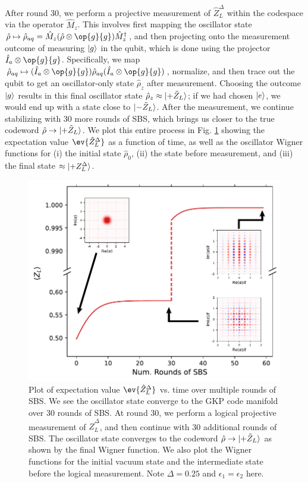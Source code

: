After round 30, we perform a projective measurement of $\hat{Z}_L^\Delta$ within the codespace via the operator $\hat{M}_z$. This involves first mapping the oscillator state $\hat{\rho} \mapsto \hat{\rho}_{aq} = \hat{M}_z(\hat{\rho}\otimes \op{g}{g})\hat{M}_z^\dagger$, and then projecting onto the measurement outcome of measuring $\lvert g\rangle$ in the qubit, which is done using the projector $\hat{I}_a \otimes \op{g}{g}$. Specifically, we map $\hat{\rho}_{aq} \mapsto (\hat{I}_a \otimes \op{g}{g}) \hat{\rho}_{aq}(\hat{I}_a \otimes \op{g}{g})$, normalize, and then trace out the qubit to get an oscillator-only state $\hat{\rho}_z$ after measurement. Choosing the outcome $\lvert g\rangle$ results in this final oscillator state $\hat{\rho}_z \approx \lvert+\tilde{Z}_L\rangle$; if we had chosen $\lvert e\rangle$, we would end up with a state close to $\lvert-\tilde{Z}_L\rangle$. After the measurement, we continue stabilizing with 30 more rounds of SBS, which brings us closer to the true codeword $\hat{\rho} \to \lvert+\tilde{Z}_L\rangle$. We plot this entire process in Fig. \ref{fig:2_SBS_NoLoss_QEC_Sim} showing the expectation value $\ev{\hat{Z}_L^\Delta}$ as a function of time, as well as the oscillator Wigner functions for (i) the initial state $\hat{\rho}_0$, (ii) the state before measurement, and (iii) the final state $\approx \lvert+Z_L^\Delta\rangle$. 

\begin{figure}[h]
    \centering
    \includegraphics[width=0.85\linewidth]{Figures/2/SBS_NoLoss_QEC_Sim.pdf}
    \caption{Plot of expectation value $\ev{\hat{Z}_L^\Delta}$ vs. time over multiple rounds of SBS. We see the oscillator state converge to the GKP code manifold over 30 rounds of SBS. At round 30, we perform a logical projective measurement of $\hat{Z}_L^\Delta$, and then continue with 30 additional rounds of SBS. The oscillator state converges to the codeword $\hat{\rho} \to \lvert+\tilde{Z}_L\rangle$ as shown by the final Wigner function. We also plot the Wigner functions for the initial vacuum state and the intermediate state before the logical measurement. Note $\Delta = 0.25$ and $\epsilon_1 = \epsilon_2$ here.}
    \label{fig:2_SBS_NoLoss_QEC_Sim}
\end{figure}

